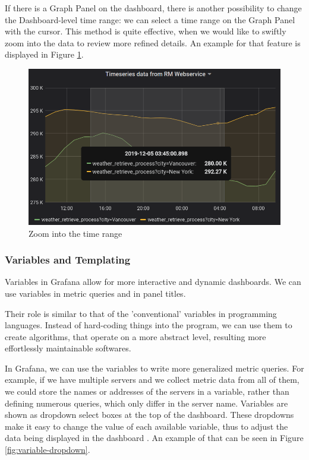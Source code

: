 If there is a Graph Panel on the dashboard, there is another possibility to change the Dashboard-level time range: we can select a time range on the Graph Panel with the cursor. This method is quite effective, when we would like to swiftly zoom into the data to review more refined details. An example for that feature is displayed in Figure \ref{fig:select-time}.

\begin{figure}[h]
	\centering
	\includegraphics[width=130mm, keepaspectratio]{figures/select-time.png}
	\caption{Zoom into the time range}
	\label{fig:select-time}
\end{figure}

\subsubsection{Variables and Templating}

Variables in Grafana allow for more interactive and dynamic dashboards. We can use variables in metric queries and in panel titles.

Their role is similar to that of the 'conventional' variables in programming languages. Instead of hard-coding things into the program, we can use them to create algorithms, that operate on a more abstract level, resulting more effortlessly maintainable softwares.

In Grafana, we can use the variables to write more generalized metric queries. For example, if we have multiple servers and we collect metric data from all of them, we could store the names or addresses of the servers in a variable, rather than defining numerous queries, which only differ in the server name. Variables are shown as dropdown select boxes at the top of the dashboard. These dropdowns make it easy to change the value of each available variable, thus to adjust the data being displayed in the dashboard \cite{grafana-variables}. An example of that can be seen in Figure \ref{fig:variable-dropdown}.

